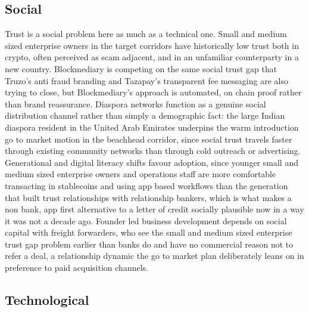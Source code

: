 \documentclass[12pt, a4paper]{article}
\begin{document}
\subsection*{Social}

Trust is a social problem here as much as a technical one. Small and medium sized
enterprise owners in the target corridors have historically low trust both in crypto,
often perceived as scam adjacent, and in an unfamiliar counterparty in a new country.
Blockmediary is competing on the same social trust gap that Truzo's anti fraud branding
and Tazapay's transparent fee messaging are also trying to close, but Blockmediary's
approach is automated, on chain proof rather than brand reassurance. Diaspora networks
function as a genuine social distribution channel rather than simply a demographic fact:
the large Indian diaspora resident in the United Arab Emirates underpins the warm
introduction go to market motion in the beachhead corridor, since social trust travels
faster through existing community networks than through cold outreach or advertising.
Generational and digital literacy shifts favour adoption, since younger small and medium
sized enterprise owners and operations staff are more comfortable transacting in
stablecoins and using app based workflows than the generation that built trust
relationships with relationship bankers, which is what makes a non bank, app first
alternative to a letter of credit socially plausible now in a way it was not a decade ago.
Founder led business development depends on social capital with freight forwarders, who
see the small and medium sized enterprise trust gap problem earlier than banks do and have
no commercial reason not to refer a deal, a relationship dynamic the go to market plan
deliberately leans on in preference to paid acquisition channels.

\subsection*{Technological}
\end{document}
